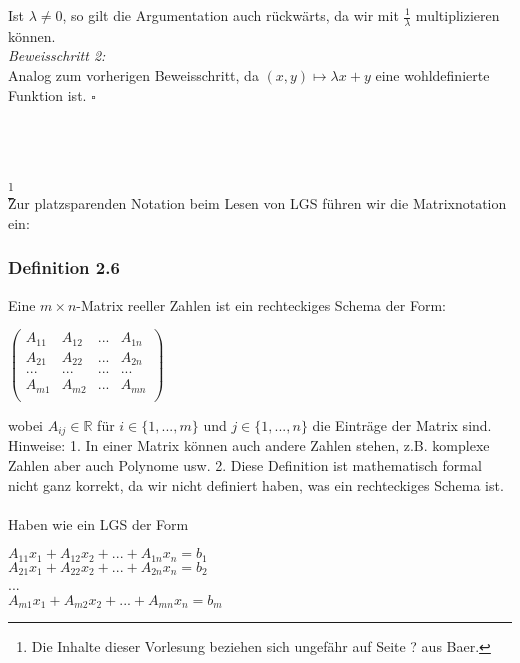 \documentclass{article}
\begin{document}
Ist $\lambda \neq 0$, so gilt die Argumentation auch rückwärts, da wir mit $\frac{1}{\lambda}$ multiplizieren können. \\
\textit{Beweisschritt 2:} \\
Analog zum vorherigen Beweisschritt, da $(x,y) \mapsto \lambda x + y$ eine wohldefinierte Funktion ist. $\square$ \\
\\
\\
\\
\date{Mittwoch, 08.11.23} \footnote[1]{Die Inhalte dieser Vorlesung beziehen sich ungefähr auf Seite ? aus Baer.} \\
Zur platzsparenden Notation beim Lesen von LGS führen wir die Matrixnotation ein: \\

\subsubsection*{Definition 2.6}
Eine $m \times n$-Matrix reeller Zahlen ist ein rechteckiges Schema der Form: \\
\begin{center}
    $\begin{pmatrix}
        A_{11} & A_{12} & ... & A_{1n} \\
        A_{21} & A_{22} & ... & A_{2n} \\
        ... & ... & ... & ... \\
        A_{m1} & A_{m2} & ... & A_{mn} \\
    \end{pmatrix}$
\end{center}
wobei $A_{ij} \in \mathbb{R}$ für $i \in \{1, ..., m\}$ und $j \in \{1, ..., n\}$ die Einträge der Matrix sind. \\
Hinweise: 1. In einer Matrix können auch andere Zahlen stehen, z.B. komplexe Zahlen aber auch Polynome usw. 2. Diese Definition ist mathematisch formal nicht ganz korrekt, da wir nicht definiert haben, was ein rechteckiges Schema ist. \\
\\
Haben wie ein LGS der Form \\
\begin{center}
    $A_{11}x_1 + A_{12}x_2 + ... + A_{1n}x_n = b_1$ \\
    $A_{21}x_1 + A_{22}x_2 + ... + A_{2n}x_n = b_2$ \\
    ... \\
    $A_{m1}x_1 + A_{m2}x_2 + ... + A_{mn}x_n = b_m$ \\
\end{center}
\end{document}
